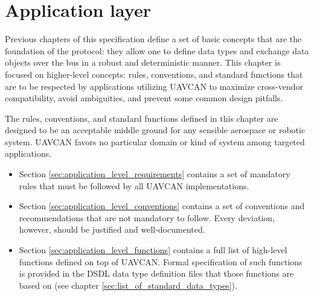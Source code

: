 \chapter{Application layer}\label{sec:application_layer}

Previous chapters of this specification define a set of basic concepts that are the foundation of the protocol:
they allow one to define data types and exchange data objects over the bus in a robust and deterministic manner.
This chapter is focused on higher-level concepts: rules, conventions, and standard functions that are to be
respected by applications utilizing UAVCAN to maximize cross-vendor compatibility, avoid ambiguities, and
prevent some common design pitfalls.

The rules, conventions, and standard functions defined in this chapter are designed to be an acceptable middle
ground for any sensible aerospace or robotic system.
UAVCAN favors no particular domain or kind of system among targeted applications.

\begin{itemize}
    \item Section \ref{sec:application_level_requirements} contains a set of mandatory rules that must be
    followed by all UAVCAN implementations.

    \item Section \ref{sec:application_level_conventions} contains a set of conventions and recommendations that
    are not mandatory to follow. Every deviation, however, should be justified and well-documented.

    \item Section \ref{sec:application_level_functions} contains a full list of high-level functions defined on
    top of UAVCAN. Formal specification of such functions is provided in the DSDL data type definition files that
    those functions are based on (see chapter \ref{sec:list_of_standard_data_types}).
\end{itemize}

\clearpage
\clearpage
\clearpage
